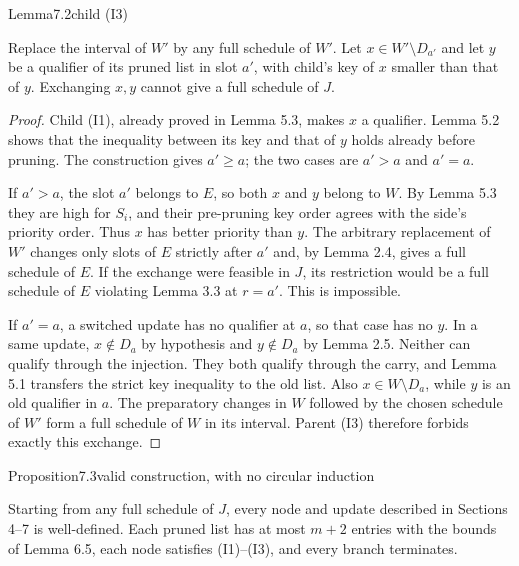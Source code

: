 \begin{numbered}{Lemma}{7.2}{child (I3)}

Replace the interval of \(W'\) by any full schedule of \(W'\). Let \(x\in W'\setminus D_{a'}\) and let \(y\) be a qualifier of its pruned list in slot \(a'\), with child's key of \(x\) smaller than that of \(y\). Exchanging \(x,y\) cannot give a full schedule of \(J\).

\end{numbered}

\begin{proof}
Child (I1), already proved in Lemma 5.3, makes \(x\) a qualifier. Lemma 5.2 shows that the inequality between its key and that of \(y\) holds already before pruning. The construction gives \(a'\geq a\); the two cases are \(a'>a\) and \(a'=a\).

If \(a'>a\), the slot \(a'\) belongs to \(E\), so both \(x\) and \(y\) belong to \(W\). By Lemma 5.3 they are high for \(S_i\), and their pre-pruning key order agrees with the side's priority order. Thus \(x\) has better priority than \(y\). The arbitrary replacement of \(W'\) changes only slots of \(E\) strictly after \(a'\) and, by Lemma 2.4, gives a full schedule of \(E\). If the exchange were feasible in \(J\), its restriction would be a full schedule of \(E\) violating Lemma 3.3 at \(r=a'\). This is impossible.

If \(a'=a\), a switched update has no qualifier at \(a\), so that case has no \(y\). In a same update, \(x\notin D_a\) by hypothesis and \(y\notin D_a\) by Lemma 2.5. Neither can qualify through the injection. They both qualify through the carry, and Lemma 5.1 transfers the strict key inequality to the old list. Also \(x\in W\setminus D_a\), while \(y\) is an old qualifier in \(a\). The preparatory changes in \(W\) followed by the chosen schedule of \(W'\) form a full schedule of \(W\) in its interval. Parent (I3) therefore forbids exactly this exchange.
\end{proof}

\begin{numbered}{Proposition}{7.3}{valid construction, with no circular induction}

Starting from any full schedule of \(J\), every node and update described in Sections 4--7 is well-defined. Each pruned list has at most \(m+2\) entries with the bounds of Lemma 6.5, each node satisfies (I1)--(I3), and every branch terminates.

\end{numbered}


